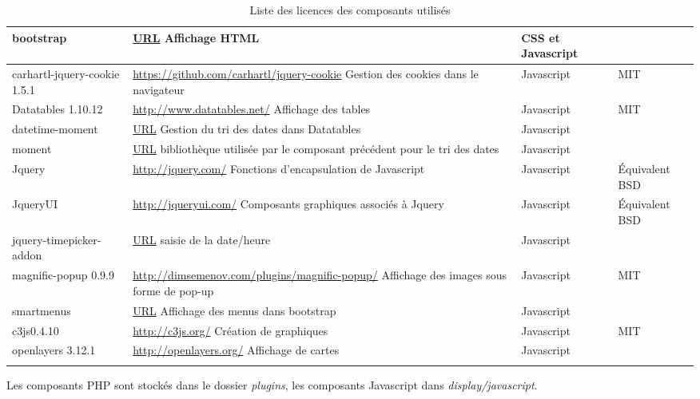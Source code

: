 \begin{longtable}{|>{\raggedright\arraybackslash}p{2cm}|p{7cm}|>{\raggedright\arraybackslash}p{1.5cm}|>{\raggedright\arraybackslash}p{1.5cm}|}
bootstrap & \url{URL} Affichage HTML & CSS et Javascript &  \\
\hline
carhartl-jquery-cookie 1.5.1 & \url{https://github.com/carhartl/jquery-cookie} Gestion des cookies dans le navigateur & Javascript & MIT \\
\hline
Datatables 1.10.12 & \url{http://www.datatables.net/} Affichage des tables & Javascript & MIT \\
\hline
datetime-moment & \url{URL} Gestion du tri des dates dans Datatables & Javascript & \\
\hline
moment & \url{URL} bibliothèque utilisée par le composant précédent pour le tri des dates & Javascript & \\
\hline
Jquery & \url{http://jquery.com/} Fonctions d'encapsulation de Javascript & Javascript & Équivalent BSD \\
\hline
JqueryUI & \url{http://jqueryui.com/} Composants graphiques associés à Jquery & Javascript & Équivalent BSD \\
\hline
jquery-timepicker-addon & \url{URL} saisie de la date/heure & Javascript & \\
\hline
magnific-popup 0.9.9 & \url{http://dimsemenov.com/plugins/magnific-popup/} Affichage des images sous forme de pop-up & Javascript & MIT \\
\hline
smartmenus & \url{URL} Affichage des menus dans bootstrap & Javascript & \\
\hline
c3js0.4.10 & \url{http://c3js.org/} Création de graphiques & Javascript & MIT \\
\hline
openlayers 3.12.1 & \url{http://openlayers.org/} Affichage de cartes & Javascript & \\
\hline

\caption{Liste des licences des composants utilisés}
\end{longtable}

Les composants PHP sont stockés dans le dossier \textit{plugins}, les composants Javascript dans \textit{display/javascript}.